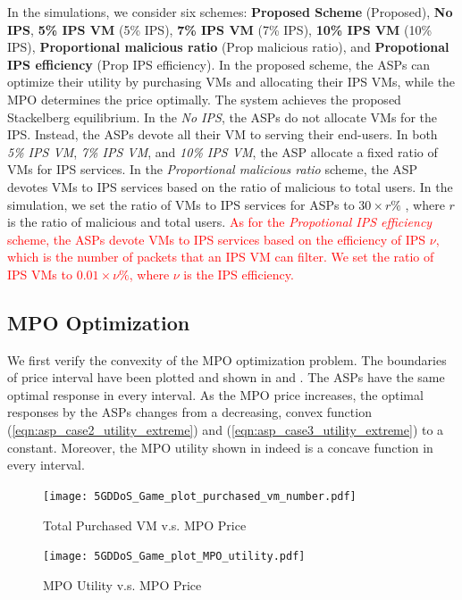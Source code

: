 \documentclass[10pt,journal, compsoc]{IEEEtran}
\begin{document}
In the simulations, we consider six schemes: \textbf{Proposed Scheme} (Proposed), \textbf{No IPS}, \textbf{5\% IPS VM} (5\% IPS), \textbf{7\% IPS VM} (7\% IPS), \textbf{10\% IPS VM} (10\% IPS), \textbf{Proportional malicious ratio} (Prop malicious ratio), and \textbf{Propotional IPS efficiency} (Prop IPS efficiency). In the proposed scheme, the ASPs can optimize their utility by purchasing VMs and allocating their IPS VMs, while the MPO determines the price optimally. The system achieves the proposed Stackelberg equilibrium. In the \textit{No IPS}, the ASPs do not allocate VMs for the IPS. Instead, the ASPs devote all their VM to serving their end-users. In both \textit{5\% IPS VM}, \textit{7\% IPS VM}, and \textit{10\% IPS VM}, the ASP allocate a fixed ratio of VMs for IPS services. In the \textit{Proportional malicious ratio} scheme, the ASP devotes VMs to IPS services based on the ratio of malicious to total users. In the simulation, we set the ratio of VMs to IPS services for ASPs to $30 \times r \%$ , where $r$ is the ratio of malicious and total users. \textcolor{red}{As for the \textit{Propotional IPS efficiency} scheme, the ASPs devote VMs to IPS services based on the efficiency of IPS $\nu$, which is the number of packets that an IPS VM can filter. We set the ratio of IPS VMs to $0.01 \times \nu \%$, where $\nu$ is the IPS efficiency.}

\subsection{MPO Optimization}\label{MPO_opti}
We first verify the convexity of the MPO optimization problem. The boundaries of price interval have been plotted and shown in  and . The ASPs have the same optimal response in every interval. As the MPO price increases, the optimal responses by the ASPs changes from a decreasing, convex function (\ref{eqn:asp_case2_utility_extreme}) and (\ref{eqn:asp_case3_utility_extreme}) to a constant. Moreover, the MPO utility shown in  indeed is a concave function in every interval. 
\begin{figure}
    \begin{minipage}{0.45\linewidth}
        \centering
        \texttt{[image: 5GDDoS\_Game\_plot\_purchased\_vm\_number.pdf]}
        \caption{Total Purchased VM v.s. MPO Price}
        \label{fig:VMnum}
    \end{minipage}
    \begin{minipage}{0.45\linewidth}
        \centering
        \texttt{[image: 5GDDoS\_Game\_plot\_MPO\_utility.pdf]}
        \caption{MPO Utility v.s. MPO Price}
        \label{fig:MPOutil}
    \end{minipage}
\end{figure}
\end{document}
